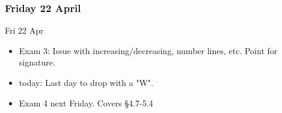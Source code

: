 \documentclass[cal1spr16Lectures.tex]{subfiles}
\begin{document}

\subsubsection{\bf Friday 22 April}

\begin{frame}[allowframebreaks]{Fri 22 Apr}
\begin{itemize}
\item Exam 3: Issue with increasing/decreasing, number lines, etc.  Point for signature.
\item today: Last day to drop with a "W".
\item Exam 4 next Friday.  Covers \S 4.7-5.4
\end{itemize}
\end{frame}


\end{document}
